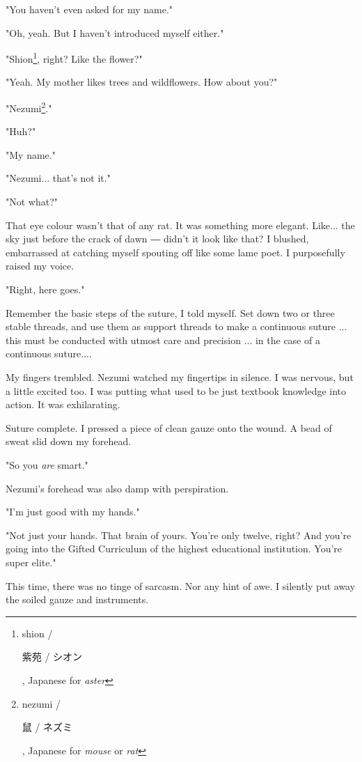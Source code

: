 "You haven't even asked for my name."

"Oh, yeah. But I haven't introduced myself either."

"Shion\footnote{shion / \begin{CJK}{UTF8}{min}紫苑 / シオン\end{CJK}, Japanese for \emph{aster}}, right? Like the flower?"

"Yeah. My mother likes trees and wildflowers. How about you?"

"Nezumi\footnote{nezumi / \begin{CJK}{UTF8}{min}鼠 / ネズミ\end{CJK}, Japanese for \emph{mouse} or \emph{rat}}."

"Huh?"

"My name."

"Nezumi... that's not it."

"Not what?"

That eye colour wasn't that of any rat. It was something more elegant.
Like... the sky just before the crack of dawn ― didn't it look like
that? I blushed, embarrassed at catching myself spouting off like some
lame poet. I purposefully raised my voice.

"Right, here goes."

Remember the basic steps of the suture, I told myself. Set down two or
three stable threads, and use them as support threads to make a
continuous suture ... this must be conducted with utmost care and
precision ... in the case of a continuous suture....

My fingers trembled. Nezumi watched my fingertips in silence. I was
nervous, but a little excited too. I was putting what used to be just
textbook knowledge into action. It was exhilarating.

Suture complete. I pressed a piece of clean gauze onto the wound. A bead
of sweat slid down my forehead.

"So you \emph{are} smart."

Nezumi's forehead was also damp with perspiration.

"I'm just good with my hands."

"Not just your hands. That brain of yours. You're only twelve, right?
And you're going into the Gifted Curriculum of the highest educational
institution. You're super elite."

This time, there was no tinge of sarcasm. Nor any hint of awe. I
silently put away the soiled gauze and instruments.~


